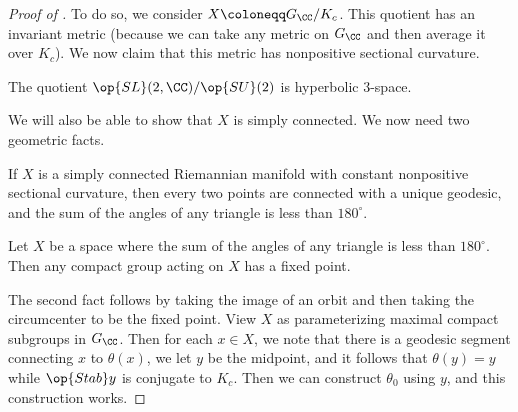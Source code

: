 \documentclass[../notes.tex]{subfiles}
\begin{document}
\begin{proof}[Proof of ]
	To do so, we consider $X\coloneqq G_\CC/K_c$. This quotient has an invariant metric (because we can take any metric on $G_\CC$ and then average it over $K_c$). We now claim that this metric has nonpositive sectional curvature.
	\begin{example}
		The quotient $\op{SL}(2,\CC)/\op{SU}(2)$ is hyperbolic $3$-space.
	\end{example}
	We will also be able to show that $X$ is simply connected. We now need two geometric facts.
	\begin{theorem}[Toponogov]
		If $X$ is a simply connected Riemannian manifold with constant nonpositive sectional curvature, then every two points are connected with a unique geodesic, and the sum of the angles of any triangle is less than $180^\circ$.
	\end{theorem}
	\begin{proposition}
		Let $X$ be a space where the sum of the angles of any triangle is less than $180^\circ$. Then any compact group acting on $X$ has a fixed point.
	\end{proposition}
	The second fact follows by taking the image of an orbit and then taking the circumcenter to be the fixed point. View $X$ as parameterizing maximal compact subgroups in $G_\CC$. Then for each $x\in X$, we note that there is a geodesic segment connecting $x$ to $\theta(x)$, we let $y$ be the midpoint, and it follows that $\theta(y)=y$ while $\op{Stab}y$ is conjugate to $K_c$. Then we can construct $\theta_0$ using $y$, and this construction works.
\end{proof}
\end{document}
